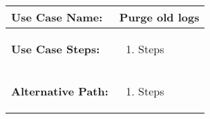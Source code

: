\medskip

\begin{tabularx}{\linewidth}{|l|X|}
\hline
\textbf{Use Case Name:} & \textbf{Purge old logs} \\
\hline
\textbf{Use Case Steps:} & 
\begin{minipage}{\linewidth} 
  \vspace{0.05em}
  \begin{enumerate}
   \item Steps
  \end{enumerate}
  \vspace{0.05em}
\end{minipage}
\\
\hline 
\textbf{Alternative Path:} &
\begin{minipage}{\linewidth}
  \vspace{0.05em} 
  \begin{enumerate}
    \item Steps
  \end{enumerate}
  \vspace{0.05em} 
\end{minipage}
\\
\hline
\end{tabularx}

\newpage


